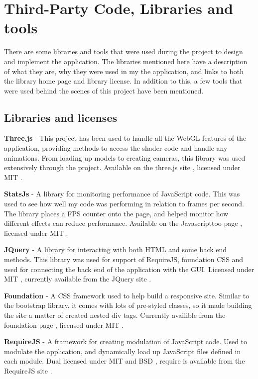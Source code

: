 \chapter{Third-Party Code, Libraries and tools}
There are some libraries and tools that were used during the project to design and implement the application. The libraries mentioned here have a description of what they are, why they were used in my the application, and links to both the library home page and library license. In addition to this, a few tools that were used behind the scenes of this project have been mentioned. 

\section{Libraries and licenses}

\textbf{Three.js} - This project has been used to handle all the WebGL features of the application, providing methods to access the shader code and handle any animations. From loading up models to creating cameras, this library was used extensively through the project. Available on the three.js site \cite{ThreeJs}, licensed under MIT \cite{MIT}.

\textbf{StatsJs} - A library for monitoring performance of JavaScript code. This was used to see how well my code was performing in relation to frames per second. The library places a FPS counter onto the page, and helped monitor how different effects can reduce performance. Available on the Javascripttoo page \cite{stats}, licensed under MIT \cite{MIT}.

\textbf{JQuery} - A library for interacting with both HTML and some back end methods. This library was used for support of RequireJS, foundation CSS and used for connecting the back end of the application with the GUI. Licensed under MIT \cite{MIT}, currently available from the JQuery site \cite{JQuery}.

\textbf{Foundation} - A CSS framework used to help build a responsive site. Similar to the bootstrap library, it comes with lots of pre-styled classes, so it made building the site a matter of created nested div tags. Currently availible from the foundation page \cite{foundation}, licensed under MIT \cite{MIT}.

\textbf{RequireJS} - A framework for creating modulation of JavaScript code. Used to modulate the application, and dynamically load up JavaScript files defined in each module. Dual licensed under MIT \cite{MIT} and BSD \cite{BSD}, require is available from the RequireJS site \cite{requirejs}.

